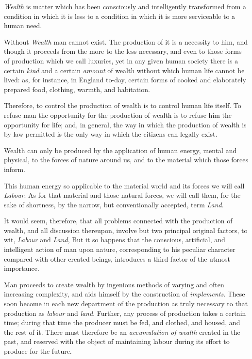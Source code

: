 \documentclass{book}
\begin{document}
\emph{Wealth} is matter which has been consciously and intelligently transformed from a condition in which it is less to a condition in which it is more serviceable to a human need.

Without \emph{Wealth} man cannot exist. The production of it is a necessity to him, and though it proceeds from the more to the less necessary, and even to those forms of production which we call luxuries, yet in any given human society there is a certain \emph{kind} and a certain \emph{amount} of wealth without which human life cannot be lived: as, for instance, in England to-day, certain forms of cooked and elaborately prepared food, clothing, warmth, and habitation.

Therefore, to control the production of wealth is to control human life itself. To refuse man the opportunity for the production of wealth is to refuse him the opportunity for life; and, in general, the way in which the production of wealth is by law permitted is the only way in which the citizens can legally exist.

Wealth can only be produced by the application of human energy, mental and physical, to the forces of nature around us, and to the material which those forces inform.

This human energy so applicable to the material world and its forces we will call \emph{Labour}. As for that material and those natural forces, we will call them, for the sake of shortness, by the narrow, but conventionally accepted, term \emph{Land}.

It would seem, therefore, that all problems connected with the production of wealth, and all discussion thereupon, involve but two principal original factors, to wit, \emph{Labour} and \emph{Land}, But it so happens that the conscious, artificial, and intelligent action of man upon nature, corresponding to his peculiar character compared with other created beings, introduces a third factor of the utmost importance.

Man proceeds to create wealth by ingenious methods of varying and often increasing complexity, and aids himself by the construction of \emph{implements}. These soon become in each new department of the production as truly necessary to that production as \emph{labour} and \emph{land}. Further, any process of production takes a certain time; during that time the producer must be fed, and clothed, and housed, and the rest of it. There must therefore be an \emph{accumulation of wealth} created in the past, and reserved with the object of maintaining labour during its effort to produce for the future.
\end{document}
